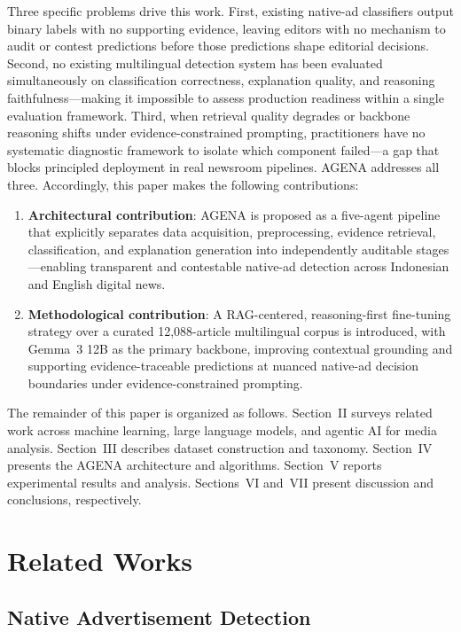 \documentclass{ieeeaccess}
\begin{document}
Three specific problems drive this work. First, existing native-ad classifiers output binary labels with no supporting evidence, leaving editors with no mechanism to audit or contest predictions before those predictions shape editorial decisions. Second, no existing multilingual detection system has been evaluated simultaneously on classification correctness, explanation quality, and reasoning faithfulness—making it impossible to assess production readiness within a single evaluation framework. Third, when retrieval quality degrades or backbone reasoning shifts under evidence-constrained prompting, practitioners have no systematic diagnostic framework to isolate which component failed—a gap that blocks principled deployment in real newsroom pipelines. AGENA addresses all three. Accordingly, this paper makes the following contributions:
\begin{enumerate}
    \item \textbf{Architectural contribution}: AGENA is proposed as a five-agent pipeline that explicitly separates data acquisition, preprocessing, evidence retrieval, classification, and explanation generation into independently auditable stages—enabling transparent and contestable native-ad detection across Indonesian and English digital news.
    \item \textbf{Methodological contribution}: A RAG-centered, reasoning-first fine-tuning strategy over a curated 12,088-article multilingual corpus is introduced, with Gemma~3 12B as the primary backbone, improving contextual grounding and supporting evidence-traceable predictions at nuanced native-ad decision boundaries under evidence-constrained prompting.
\end{enumerate}

The remainder of this paper is organized as follows. Section~II surveys related work across machine learning, large language models, and agentic AI for media analysis. Section~III describes dataset construction and taxonomy. Section~IV presents the AGENA architecture and algorithms. Section~V reports experimental results and analysis. Sections~VI and~VII present discussion and conclusions, respectively.

\section{Related Works}
\label{sec:related-works}

\subsection{Native Advertisement Detection}
\end{document}
